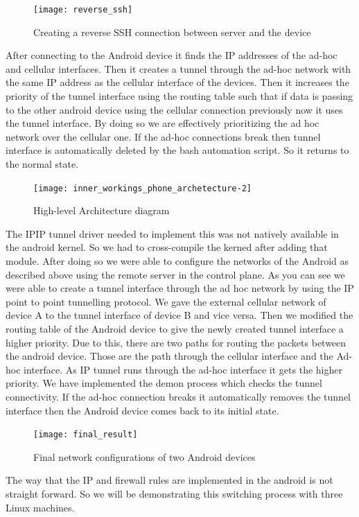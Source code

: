 \begin{figure}[H]
    \centering
    \texttt{[image: reverse\_ssh]}
    \caption{Creating a reverse SSH connection between server and the device}
    \label{fig:reverse_ssh_1231313}
\end{figure}
\vspace{12pt}

After connecting to the Android device it finds the IP addresses of the ad-hoc and cellular interfaces. Then it creates a tunnel through the ad-hoc network with the same IP address as the cellular interface of the devices. Then it increases the priority of the tunnel interface using the routing table such that if data is passing to the other android device using the cellular connection previously now it uses the tunnel interface. By doing so we are effectively prioritizing the ad hoc network over the cellular one. If the ad-hoc connections break then tunnel interface is automatically deleted by the bash automation script. So it returns to the normal state.
\begin{figure}[H]
    \centering
    \texttt{[image: inner\_workings\_phone\_archetecture-2]}
    \caption{ High-level Architecture diagram }
    \label{fig:inner_workings_phone_archetecture_23231231231}
\end{figure}
\vspace{12pt}
The IPIP tunnel driver needed to implement this was not natively available in the android kernel. So we had to cross-compile the kerned after adding that module. After doing so we were able to configure the networks of the Android as described above using the remote server in the control plane. As you can see we were able to create a tunnel interface through the ad hoc network by using the IP point to point tunnelling protocol. We gave the external cellular network of device A to the tunnel interface of device B and vice versa. Then we modified the routing table of the Android device to give the newly created tunnel interface a higher priority. Due to this, there are two paths for routing the packets between the android device. Those are the path through the cellular interface and the Ad-hoc interface. As IP tunnel runs through the ad-hoc interface it gets the higher priority. We have implemented the demon process which checks the tunnel connectivity. If the ad-hoc connection breaks it automatically removes the tunnel interface then the Android device comes back to its initial state. 
\begin{figure}[H]
    \centering
    \texttt{[image: final\_result]}
    \caption{Final network configurations of two Android devices}
    \label{fig:final_result_2323445}
\end{figure}
\vspace{12pt}

The way that the IP and firewall rules are implemented in the android is not straight forward. So we will be demonstrating this switching process with three Linux machines.










